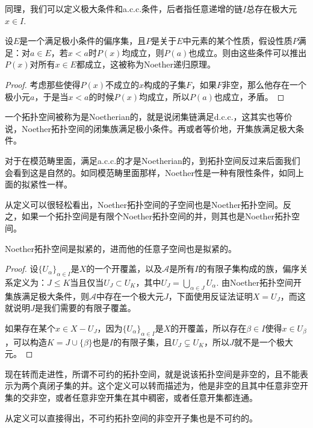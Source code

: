 同理，我们可以定义极大条件和a.c.c.条件，后者指任意递增的链$I$总存在极大元$x\in I$.

\begin{pro}
设$E$是一个满足极小条件的偏序集，且$P$是关于$E$中元素的某个性质，假设性质$P$满足：对$a\in E$，若$x< a$时$P(x)$均成立，则$P(a)$也成立。则由这些条件可以推出$P(x)$对所有$x\in E$都成立，这被称为Noether递归原理。
\end{pro}

\begin{proof} 考虑那些使得$P(x)$不成立的$x$构成的子集$F$，如果$F$非空，那么他存在一个极小元$a$，于是当$x< a$的时候$P(x)$均成立，所以$P(a)$也成立，矛盾。\end{proof}

\para 一个拓扑空间被称为是Noetherian的，就是说闭集链满足d.c.c.，这其实也等价说，Noether拓扑空间的闭集族满足极小条件。再或者等价地，开集族满足极大条件。\endpara

对于在模范畴里面，满足a.c.c.的才是Noetherian的，到拓扑空间反过来后面我们会看到这是自然的。如同模范畴里面那样，Noether性是一种有限性条件，如同上面的拟紧性一样。

从定义可以很轻松看出，Noether拓扑空间的子空间也是Noether拓扑空间。反之，如果一个拓扑空间是有限个Noether拓扑空间的并，则其也是Noether拓扑空间。

\begin{pro}
Noether拓扑空间是拟紧的，进而他的任意子空间也是拟紧的。
\end{pro}

\begin{proof}
设$\{U_\alpha\}_{\alpha\in I}$是$X$的一个开覆盖，以及$\mathscr{A}$是所有$I$的有限子集构成的族，偏序关系定义为：$J\leq K$当且仅当$U_J\subset U_K$，其中$U_J=\bigcup_{\alpha\in J}U_\alpha$. 由Noether拓扑空间开集族满足极大条件，则$\mathscr{A}$中存在一个极大元$J$，下面使用反证法证明$X=U_J$，而这就说明$J$是我们需要的有限子覆盖。

如果存在某个$x\in X-U_J$，因为$\{U_\alpha\}_{\alpha\in I}$是$X$的开覆盖，所以存在$\beta \in I$使得$x\in U_\beta$，可以构造$K=J\cup \{\beta\}$也是$I$的有限子集，且$U_J\subsetneq U_K$，所以$J$就不是一个极大元。
\end{proof}

\para 现在转而走进性，所谓不可约的拓扑空间，就是说该拓扑空间是非空的，且不能表示为两个真闭子集的并。这个定义可以转而描述为，他是非空的且其中任意非空开集的交非空，或者任意非空开集在其中稠密，或者任意开集都连通。\endpara

从定义可以直接得出，不可约拓扑空间的非空开子集也是不可约的。

